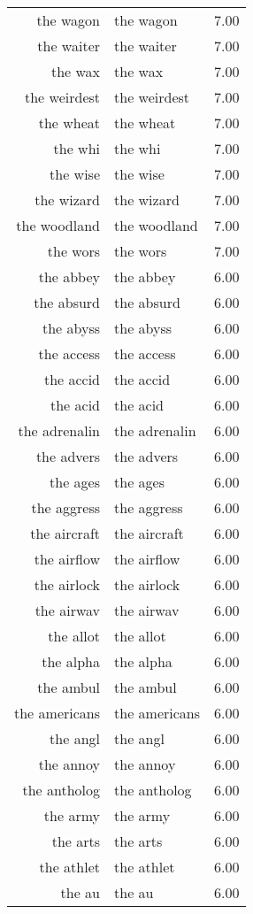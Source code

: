 \begin{table}[ht]
\begin{tabular}{rlr}
  the wagon & the wagon & 7.00 \\ 
  the waiter & the waiter & 7.00 \\ 
  the wax & the wax & 7.00 \\ 
  the weirdest & the weirdest & 7.00 \\ 
  the wheat & the wheat & 7.00 \\ 
  the whi & the whi & 7.00 \\ 
  the wise & the wise & 7.00 \\ 
  the wizard & the wizard & 7.00 \\ 
  the woodland & the woodland & 7.00 \\ 
  the wors & the wors & 7.00 \\ 
  the abbey & the abbey & 6.00 \\ 
  the absurd & the absurd & 6.00 \\ 
  the abyss & the abyss & 6.00 \\ 
  the access & the access & 6.00 \\ 
  the accid & the accid & 6.00 \\ 
  the acid & the acid & 6.00 \\ 
  the adrenalin & the adrenalin & 6.00 \\ 
  the advers & the advers & 6.00 \\ 
  the ages & the ages & 6.00 \\ 
  the aggress & the aggress & 6.00 \\ 
  the aircraft & the aircraft & 6.00 \\ 
  the airflow & the airflow & 6.00 \\ 
  the airlock & the airlock & 6.00 \\ 
  the airwav & the airwav & 6.00 \\ 
  the allot & the allot & 6.00 \\ 
  the alpha & the alpha & 6.00 \\ 
  the ambul & the ambul & 6.00 \\ 
  the americans & the americans & 6.00 \\ 
  the angl & the angl & 6.00 \\ 
  the annoy & the annoy & 6.00 \\ 
  the antholog & the antholog & 6.00 \\ 
  the army & the army & 6.00 \\ 
  the arts & the arts & 6.00 \\ 
  the athlet & the athlet & 6.00 \\ 
  the au & the au & 6.00 \\ 

\end{tabular}
\end{table}
